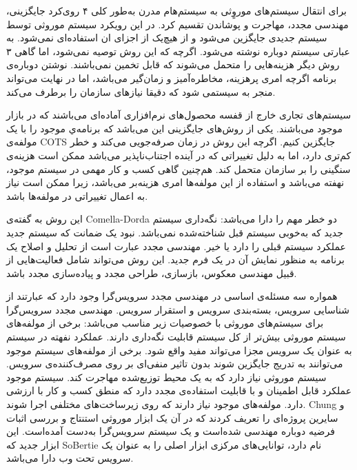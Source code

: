 برای انتقال سیستم‌های موروٍثی به سیستم‌هام مدرن به‌طور کلی ۴ روی‌کرد جایگزینی، مهندسی مجدد، مهاجرت و پوشاندن تقسیم کرد.
در این رویکرد سیستم موروثی توسط سیستم جدیدی جایگزین می‌شود و از هیچ‌یک از اجزای ان استفاده‌ای نمی‌شود. به عبارتی سیستم دوباره نوشته می‌شود. اگرچه که این روش توصیه نمی‌شود، اما گاهی ۳ روش دیگر هزینه‌هایی را متحمل می‌شوند که قابل‌ تخمین نمی‌باشند. نوشتن دوباره‌ی برنامه اگرچه امری‌ پرهزینه، مخاطره‌آمیز و زمان‌گیر می‌باشد، اما در نهایت می‌تواند منجر به سیستمی شود که دقیقا نیازهای سازمان را برطرف می‌کند.
 
سیستم‌های تجاری خارج از قفسه محصول‌های نرم‌افزاری آماده‌ای می‌باشند که در بازار موجود می‌باشند. یکی از روش‌های جایگزینی این می‌باشد که برنامه‌ي موجود را با یک مولفه‌ی COTS جایگزین کنیم. اگرچه این روش در زمان صرفه‌جویی می‌کند و خطر کم‌تری دارد،‌ اما به دلیل تغییراتی که در آینده اجتناب‌ناپذیر می‌باشد ممکن است هزینه‌ی سنگینی را بر سازمان متحمل کند. هم‌چنین گاهی کسب و کار مهمی در سیستم‌ موجود، نهفته می‌باشد و استفاده از این مولفه‌ها امری هزینه‌بر می‌باشد، زیرا ممکن است نیاز به اعمال تغییراتی در مولفه‌ها باشد. 

این روش به گفته‌ی Comella-Dorda دو خطر مهم را دارا می‌باشد:
 نگه‌داری سیستم جدید که به‌خوبی سیستم قبل شناخته‌شده نمی‌باشد.
 نبود یک ضمانت که سیستم جدید عملکرد سیستم قبلی را دارد یا خیر. 
مهندسی مجدد عبارت است از تحلیل و اصلاح یک برنامه به منظور نمایش آن در یک فرم جدید. این روش می‌تواند شامل فعالیت‌هایی از قبیل مهندسی معکوس، بازسازی، طراحی مجدد و پیاده‌سازی مجدد باشد.

همواره سه مسئله‌ی اساسی در مهندسی مجدد سرویس‌گرا وجود دارد که عبارتند از شناسایی سرویس، بسته‌بندی سرویس  و استقرار سرویس. مهندسی مجدد سرویس‌گرا برای سیستم‌های موروثی با خصوصیات زیر  مناسب می‌باشد:
 برخی از مولفه‌های سیستم موروثی بیش‌تر از کل سیستم قابلیت نگه‌داری دارند.
 عملکرد نفهته در سیستم به عنوان یک سرویس مجزا می‌تواند مفید واقع شود.
 برخی از مولفه‌های سیستم موجود می‌توانند به تدریج جایگزین شوند بدون تاثیر منفی‌ای بر روی مصرف‌کننده‌ی سرویس.
 سیستم موروثی نیاز دارد که به یک محیط توزیع‌شده مهاجرت کند.
 سیستم موجود عملکرد قابل اطمینان و با قابلیت استفاده‌ی مجدد دارد که منطق کسب‌ و کار با ارزشی دارد.
 مولفه‌های موجود نیاز دارند که روی زیرساخت‌های مختلفی اجرا شوند.
Chung  و سایرین پروژه‌ای را تعریف کردند که در آن یک ابزار موروثی استنتاج و بررسی اثبات فرضیه دوباره مهندسی شده‌است و یک سیستم سرویس‌گرا به‌دست آمده‌است. این ابزار جدید که SoBertie نام دارد، توانایی‌های مرکزی ابزار اصلی را به عنوان یک سرویس تحت وب دارا می‌باشد. 

